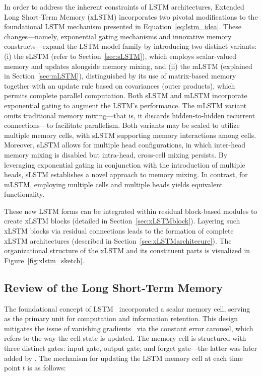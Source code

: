 In order to address the inherent constraints of LSTM architectures, Extended Long Short-Term Memory (xLSTM) incorporates two pivotal modifications to the foundational LSTM mechanism presented in Equation~\eqref{eq:lstm_idea}. These changes—namely, exponential gating mechanisms and innovative memory constructs—expand the LSTM model family by introducing two distinct variants: (i) the sLSTM (refer to Section~\ref{sec:sLSTM}), which employs scalar-valued memory and updates alongside memory mixing, and (ii) the mLSTM (explained in Section~\ref{sec:mLSTM}), distinguished by its use of matrix-based memory together with an update rule based on covariances (outer products), which permits complete parallel computation. Both sLSTM and mLSTM incorporate exponential gating to augment the LSTM's performance. The mLSTM variant omits traditional memory mixing—that is, it discards hidden-to-hidden recurrent connections—to facilitate parallelism. Both variants may be scaled to utilize multiple memory cells, with sLSTM supporting memory interactions among cells. Moreover, sLSTM allows for multiple head configurations, in which inter-head memory mixing is disabled but intra-head, cross-cell mixing persists. By leveraging exponential gating in conjunction with the introduction of multiple heads, sLSTM establishes a novel approach to memory mixing. In contrast, for mLSTM, employing multiple cells and multiple heads yields equivalent functionality.

These new LSTM forms can be integrated within residual block-based modules to create xLSTM blocks (detailed in Section~\ref{sec:xLSTMblock}). Layering such xLSTM blocks via residual connections leads to the formation of complete xLSTM architectures (described in Section~\ref{sec:xLSTMarchitecure}). The organizational structure of the xLSTM and its constituent parts is visualized in Figure~\ref{fig:xlstm_sketch}.

\subsection{Review of the Long Short-Term Memory}
\label{sec:orgLSTM}

The foundational concept of LSTM~\citep{Hochreiter:91,Hochreiter:97nips,Hochreiter:97} incorporated a scalar memory cell, serving as the primary unit for computation and information retention. This design mitigates the issue of vanishing gradients~\citep{Hochreiter:91,Hochreiter:00book} via the constant error carousel, which refers to the way the cell state is updated. The memory cell is structured with three distinct gates: input gate, output gate, and forget gate—the latter was later added by \citet{Gers:00}. The mechanism for updating the LSTM memory cell at each time point $t$ is as follows:

